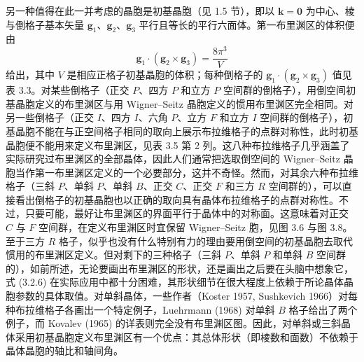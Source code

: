 另一种值得在此一并考虑的晶胞是初基晶胞（见 1.5 节），即以 $\mathbf{k} = \mathbf{0}$ 为中心、棱与倒格子基本矢量 $\mathbf{g}_{1}$、$\mathbf{g}_{2}$、$\mathbf{g}_{3}$ 平行且等长的平行六面体。第一布里渊区的体积便由
\begin{equation*}
\mathbf{g}_{1} \cdot (\mathbf{g}_{2} \times \mathbf{g}_{3}) = \frac{8\pi^{3}}{V}
\tag{3.2.7}
\end{equation*}
给出，其中 $V$ 是相应正格子初基晶胞的体积；每种倒格子的 $\mathbf{g}_{1} \cdot (\mathbf{g}_{2} \times \mathbf{g}_{3})$ 值见表 3.3。对某些倒格子（正交 $P$、四方 $P$ 和立方 $P$ 空间群的倒格子），用倒空间初基晶胞定义的布里渊区与用 Wigner--Seitz 晶胞定义的惯用布里渊区完全相同。对另一些倒格子（正交 $I$、四方 $I$、六角 $P$、立方 $F$ 和立方 $I$ 空间群的倒格子），初基晶胞不能在与正空间格子相同的取向上展示布拉维格子的点群对称性，此时初基晶胞便不能用来定义布里渊区，见表 3.5 第 2 列。这八种布拉维格子几乎涵盖了实际研究过布里渊区的全部晶体，因此人们通常把选取倒空间的 Wigner--Seitz 晶胞当作第一布里渊区定义的一个必要部分，这并不奇怪。然而，对其余六种布拉维格子（三斜 $P$、单斜 $P$、单斜 $B$、正交 $C$、正交 $F$ 和三方 $R$ 空间群的），可以直接看出倒格子的初基晶胞也以正确的取向具有晶体布拉维格子的点群对称性。不过，只要可能，最好让布里渊区的界面平行于晶体中的对称面。这意味着对正交 $C$ 与 $F$ 空间群，在定义布里渊区时宜保留 Wigner--Seitz 胞，见图 3.6 与图 3.8。至于三方 $R$ 格子，似乎也没有什么特别有力的理由要用倒空间的初基晶胞去取代惯用的布里渊区定义。但对剩下的三种格子（三斜 $P$、单斜 $P$ 和单斜 $B$ 空间群的），如前所述，无论要画出布里渊区的形状，还是画出之后要在头脑中想象它，式 (3.2.6) 在实际应用中都十分困难，其形状细节在很大程度上依赖于所论晶体晶胞参数的具体取值。对单斜晶体，一些作者（Koster 1957, Sushkevich 1966）对每种布拉维格子各画出一个特定例子，Luehrmann (1968) 对单斜 $B$ 格子给出了两个例子，而 Kovalev (1965) 的详表则完全没有布里渊区图。因此，对单斜或三斜晶体采用初基晶胞定义布里渊区有一个优点：其总体形状（即棱数和面数）不依赖于晶体晶胞的轴比和轴间角。

